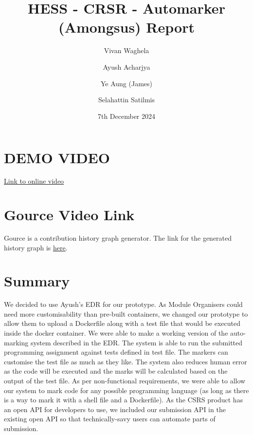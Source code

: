 \documentclass[a4paper, 12pt]{article}
\begin{document}
\title{HESS - CRSR - Automarker (Amongsus) Report}
\author{Vivan Waghela \and Ayush Acharjya \and Ye Aung (James) \and Selahattin Satilmis}
\date{7th December 2024}
\maketitle

\section*{DEMO VIDEO}
\noindent\href{https://bham-my.sharepoint.com/personal/axa2204_student_bham_ac_uk/_layouts/15/guestaccess.aspx?share=ETttWhWBaN5Cg4imyyt9B0sBOtxlj_SgOvyaVzMR3Kuz4g&nav=eyJyZWZlcnJhbEluZm8iOnsicmVmZXJyYWxBcHAiOiJPbmVEcml2ZUZvckJ1c2luZXNzIiwicmVmZXJyYWxBcHBQbGF0Zm9ybSI6IldlYiIsInJlZmVycmFsTW9kZSI6InZpZXciLCJyZWZlcnJhbFZpZXciOiJNeUZpbGVzTGlua0NvcHkifX0&e=0tRqZy}{Link to online video}

\section*{Gource Video Link}
Gource is a contribution history graph generator. The link for the generated history graph is \href{https://bham-my.sharepoint.com/personal/vxw397_student_bham_ac_uk/_layouts/15/guestaccess.aspx?share=EfxBPncvaS9Ikv4icBteGqkBTj_La-L_GhuZvfUcs9hWzA&nav=eyJyZWZlcnJhbEluZm8iOnsicmVmZXJyYWxBcHAiOiJPbmVEcml2ZUZvckJ1c2luZXNzIiwicmVmZXJyYWxBcHBQbGF0Zm9ybSI6IldlYiIsInJlZmVycmFsTW9kZSI6InZpZXciLCJyZWZlcnJhbFZpZXciOiJNeUZpbGVzTGlua0NvcHkifX0&e=ppezH1}{here}.

\section*{Summary}
We decided to use Ayush's EDR for our prototype. As Module Organisers could need more customisability than pre-built containers, we changed our prototype to allow them to upload a Dockerfile along with a test file that would be executed inside the docker container. We were able to make a working version of the auto-marking system described in the EDR. The system is able to run the submitted programming assignment against tests defined in test file. The markers can customise the test file as much as they like. The system also reduces human error as the code will be executed and the marks will be calculated based on the output of the test file. As per non-functional requirements, we were able to allow our system to mark code for any possible programming language (as long as there is a way to mark it with a shell file and a Dockerfile). As the CSRS product has an open API for developers to use, we included our submission API in the existing open API so that technically-savy users can automate parts of submission.
\end{document}
